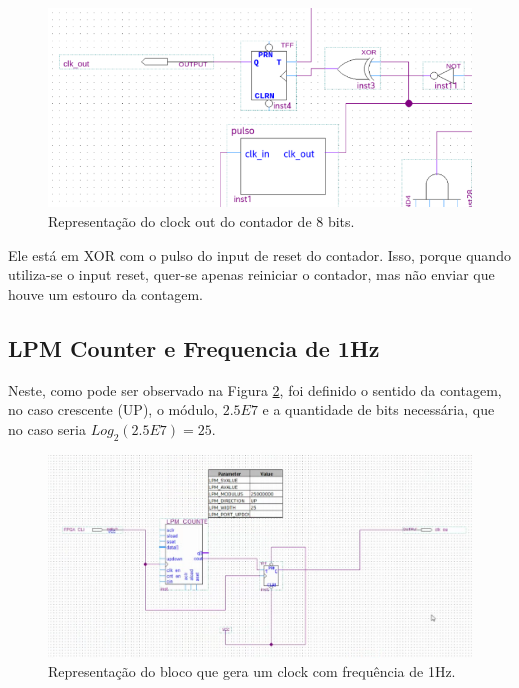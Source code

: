 \begin{figure}[H]
	\centering
	\includegraphics[width=1\columnwidth]{FIGURAS/cap_2/contador_8bits_clockout.png}
	\caption{Representação do clock out do contador de 8 bits.}
        \label{fig:2.9}
\end{figure}



Ele está em XOR com o pulso do input de reset do contador. Isso, porque quando utiliza-se o input reset, quer-se apenas reiniciar o contador, mas não enviar que houve um estouro da contagem.


\subsection{LPM Counter e Frequencia de 1Hz}

Neste, como pode ser observado na Figura \ref{fig:2.10}, foi definido o sentido da contagem, no caso crescente (UP), o módulo, $2.5E7$ e a quantidade de bits necessária, que no caso seria $Log_2(2.5E7) = 25$.

\begin{figure}[H]
	\centering
	\includegraphics[width=1\columnwidth]{FIGURAS/cap_2/freq_1hz.png}
	\caption{Representação do bloco que gera um clock com frequência de 1Hz.}
        \label{fig:2.10}
\end{figure}


